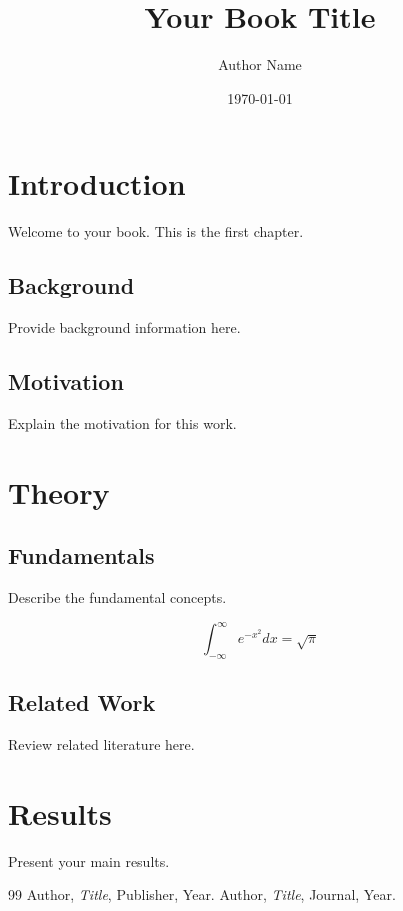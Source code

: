 \documentclass{book}
\title{Your Book Title}
\author{Author Name}
\date{\today}
\begin{document}
\frontmatter

\maketitle

\tableofcontents

\mainmatter

\chapter{Introduction}

Welcome to your book. This is the first chapter.

\section{Background}

Provide background information here.

\section{Motivation}

Explain the motivation for this work.

\chapter{Theory}

\section{Fundamentals}

Describe the fundamental concepts.

\begin{equation}
\int_{-\infty}^{\infty} e^{-x^2} dx = \sqrt{\pi}
\end{equation}

\section{Related Work}

Review related literature here.

\chapter{Results}

Present your main results.

\begin{thebibliography}{99}
 Author, \emph{Title}, Publisher, Year.
 Author, \emph{Title}, Journal, Year.
\end{thebibliography}

\backmatter
\end{document}

